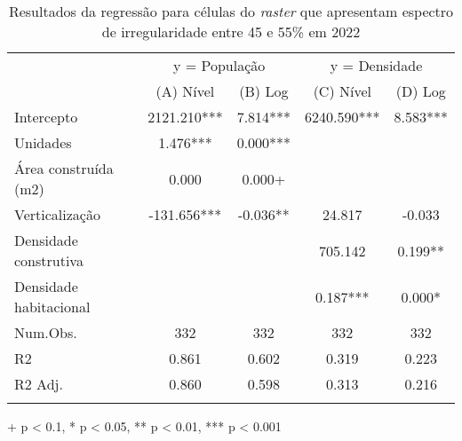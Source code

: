\begin{table}[h]
\caption{Resultados da regressão para células do \textit{raster} que apresentam espectro de irregularidade entre 45 e 55\% em 2022} 
\centering
\fontsize{10.0pt}{12pt}\selectfont
\begin{tabular*}{.9\linewidth}{@{\extracolsep{\fill}}lcccc}
\toprule
 & \multicolumn{2}{c}{y = População} & \multicolumn{2}{c}{y = Densidade} \\ 
\cmidrule(lr){2-3} \cmidrule(lr){4-5}
  & (A) Nível & (B) Log & (C) Nível & (D) Log \\ 
\midrule\addlinespace[2.5pt]
Intercepto & 2121.210*** & 7.814*** & 6240.590*** & 8.583*** \\ 
Unidades & 1.476*** & 0.000*** &  &  \\ 
Área construída (m2) & 0.000 & 0.000+ &  &  \\ 
Verticalização & -131.656*** & -0.036** & 24.817 & -0.033 \\ 
Densidade construtiva &  &  & 705.142 & 0.199** \\ 
{Densidade habitacional} & {} & {} & {0.187***} & {0.000*} \\ 
\midrule
Num.Obs. & 332 & 332 & 332 & 332 \\ 
R2 & 0.861 & 0.602 & 0.319 & 0.223 \\ 
R2 Adj. & 0.860 & 0.598 & 0.313 & 0.216 \\ 
\bottomrule\vspace{0pt}
\end{tabular*}
\label{tab:regressao-1}
\begin{minipage}{.9\linewidth}
+ p < 0.1, * p < 0.05, ** p < 0.01, *** p < 0.001\\
\end{minipage}
\end{table}

